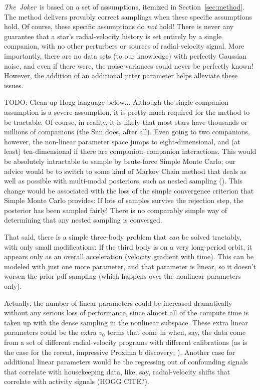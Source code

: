 \documentclass[manuscript, letterpaper]{aastex6}
\newcommand{\project}[1]{\textsl{#1}}
\newcommand{\samplername}{\project{The~Joker}}
\newcommand{\sectionname}{Section}
\newcommand{\todo}[1]{{\color{red}TODO: #1}}
\begin{document}
\samplername\ is based on a set of assumptions, itemized in
\sectionname~\ref{sec:method}.
The method delivers provably correct samplings when these specific assumptions
hold.
Of course, these specific assumptions do \emph{not} hold!
There is never any guarantee that a star's radial-velocity history
is set entirely by a single companion, with no other perturbers or
sources of radial-velocity signal.
More importantly, there are no data sets (to our knowledge) with
perfectly Gaussian noise, and even if there were, the noise variances
could never be perfectly known!
However, the addition of an additional jitter parameter helps
alleviate these issues.

\todo{Clean up Hogg language below...}
Although the single-companion assumption is a severe assumption, it
is pretty-much required for the method to be tractable.
Of course, in reality, it is likely that most stars have thousands or
millions of companions (the Sun does, after all).
Even going to two companions, however, the non-linear parameter space
jumps to eight-dimensional, and (at least) ten-dimensional if there
are companion--companion interactions.
This would be absolutely intractable to sample by brute-force Simple
Monte Carlo; our advice would be to switch to some kind of Markov
Chain method that deals as well as possible with multi-modal
posteriors, such as nested sampling (\citealt{skilling, brewer}).
This change would be associated with the loss of the simple
convergence criterion that Simple Monte Carlo provides: If lots of
samples survive the rejection step, the posterior has been sampled
fairly!
There is no comparably simple way of determining that any nested
sampling is converged.

That said, there is a simple three-body problem that \emph{can} be
solved tractably, with only small modifications:
If the third body is on a very long-period orbit, it appears only
as an overall acceleration (velocity gradient with time).
This can be modeled with just one more parameter, and that parameter
is linear, so it doesn't worsen the prior pdf sampling (which happens
over the nonlinear parameters only).

Actually, the number of linear parameters could be increased
dramatically without any serious loss of performance, since almost all
of the compute time is taken up with the dense sampling in the nonlinear
subspace.
These extra linear parameters could be the extra $v_0$ terms that come
in when, say, the data come from a set of different radial-velocity
programs with different calibrations (as is the case for the recent,
impressive Proxima b discovery; \citealt{proximab}).
Another case for additional linear parameters would be the regressing
out of confounding signals that correlate with housekeeping data,
like, say, radial-velocity shifts that correlate with activity signals
(HOGG CITE?).
\end{document}
